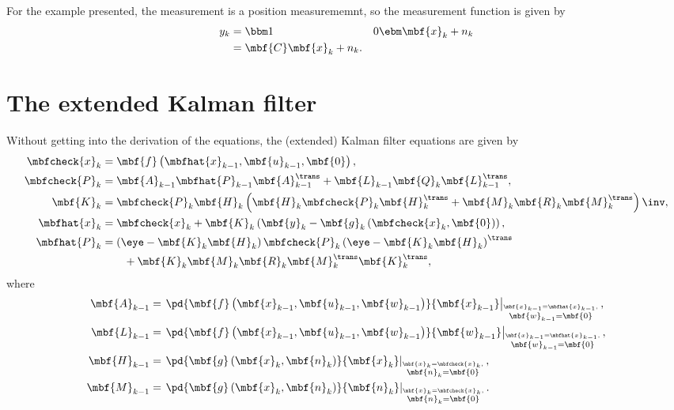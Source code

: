 \documentclass[nobib, nofonts, notoc]{tufte-handout}
\begin{document}
    For the example presented, the measurement is a position measurememnt, so the measurement function is given by
    \begin{align}
        y_{k} &= \bbm 1 & 0 \ebm\mbf{x}_{k} + n_{k}\\
        &= \mbf{C}\mbf{x}_{k} + n_{k}.
    \end{align}


    \section{The extended Kalman filter}
    Without getting into the derivation of the equations, the (extended) Kalman filter equations are given by \cite[eq.~(4.32)]{Barfoot_State_2017a}
    \begin{subequations}    
        \label{eq:EKF eqns}
        \begin{align}
            \label{eq:EKF: prediction}
            \mbfcheck{x}_{k} &= \mbf{f}\left( \mbfhat{x}_{k-1}, \mbf{u}_{k-1}, \mbf{0} \right), \\
            \label{eq:EKF: prediction cov}
            \mbfcheck{P}_{k} &= \mbf{A}_{k-1}\mbfhat{P}_{k-1}\mbf{A}_{k-1}^{\trans} + \mbf{L}_{k-1}\mbf{Q}_{k}\mbf{L}_{k-1}^{\trans},\\
            \label{eq:EKF: KF gain}
            \mbf{K}_{k} &= \mbfcheck{P}_{k}\mbf{H}_{k}\left( \mbf{H}_{k}\mbfcheck{P}_{k}\mbf{H}_{k}^{\trans} + \mbf{M}_{k}\mbf{R}_{k}\mbf{M}_{k}^{\trans} \right)\inv,\\
            \label{eq:EKF: correction}
            \mbfhat{x}_{k} &= \mbfcheck{x}_{k} + \mbf{K}_{k}\left( \mbf{y}_{k} - \mbf{g}_{k}\left( \mbfcheck{x}_{k}, \mbf{0} \right) \right),\\
            \label{eq:EKF: correction cov}
            \mbfhat{P}_{k} &= \left( \eye - \mbf{K}_{k}\mbf{H}_{k} \right)\mbfcheck{P}_{k}\left( \eye - \mbf{K}_{k}\mbf{H}_{k} \right)^{\trans} \nonumber\\&\qquad+ \mbf{K}_{k}\mbf{M}_{k}\mbf{R}_{k}\mbf{M}_{k}^{\trans}\mbf{K}_{k}^{\trans},
        \end{align}
    \end{subequations}
    where 
    \begin{align}
        \mbf{A}_{k-1} &= \left.\pd{\mbf{f}\left( \mbf{x}_{k-1}, \mbf{u}_{k-1}, \mbf{w}_{k-1} \right)}{\mbf{x}_{k-1}}\right|_{\overset{\mbf{x}_{k-1}=\mbfhat{x}_{k-1},}{\mbf{w}_{k-1}=\mbf{0}}},\\
        \mbf{L}_{k-1} &= \left.\pd{\mbf{f}\left( \mbf{x}_{k-1}, \mbf{u}_{k-1}, \mbf{w}_{k-1} \right)}{\mbf{w}_{k-1}}\right|_{\overset{\mbf{x}_{k-1}=\mbfhat{x}_{k-1},}{\mbf{w}_{k-1}=\mbf{0}}},\\
        \mbf{H}_{k-1} &= \left.\pd{\mbf{g}\left( \mbf{x}_{k}, \mbf{n}_{k} \right)}{\mbf{x}_{k}}\right|_{\overset{\mbf{x}_{k}=\mbfcheck{x}_{k},}{\mbf{n}_{k}=\mbf{0}}},\\
        \mbf{M}_{k-1} &= \left.\pd{\mbf{g}\left( \mbf{x}_{k}, \mbf{n}_{k} \right)}{\mbf{n}_{k}}\right|_{\overset{\mbf{x}_{k}=\mbfcheck{x}_{k},}{\mbf{n}_{k}=\mbf{0}}}.
    \end{align}
\end{document}

